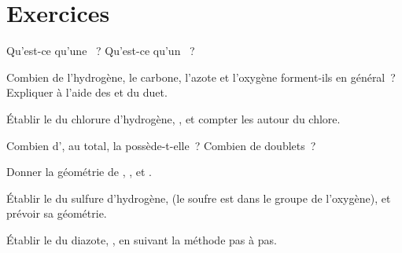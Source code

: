 \section{Exercices}

\begin{exercise}[$\star$]\label{exo:g10:lewis-and-shape:1}
Qu'est-ce qu'une ~? Qu'est-ce qu'un ~?
\end{exercise}

\begin{exercise}[$\star$]\label{exo:g10:lewis-and-shape:2}
Combien de  l'hydrogène, le carbone, l'azote et
l'oxygène forment-ils en général~? Expliquer à l'aide des  et du duet.
\end{exercise}

\begin{exercise}[$\star$]\label{exo:g10:lewis-and-shape:3}
Établir le  du chlorure d'hydrogène, , et compter
les  autour du chlore.
\end{exercise}

\begin{exercise}[$\star$]\label{exo:g10:lewis-and-shape:4}
Combien d', au total, la  
possède-t-elle~? Combien de doublets~?
\end{exercise}

\begin{exercise}[$\star$]\label{exo:g10:lewis-and-shape:5}
Donner la géométrie de , ,  et .
\end{exercise}

\begin{exercise}[$\star\star$]\label{exo:g10:lewis-and-shape:6}
Établir le  du sulfure d'hydrogène,  (le soufre
est dans le groupe de l'oxygène), et prévoir sa géométrie.
\end{exercise}

\begin{exercise}[$\star\star$]\label{exo:g10:lewis-and-shape:7}
Établir le  du diazote, , en suivant la méthode pas
à pas.
\end{exercise}

